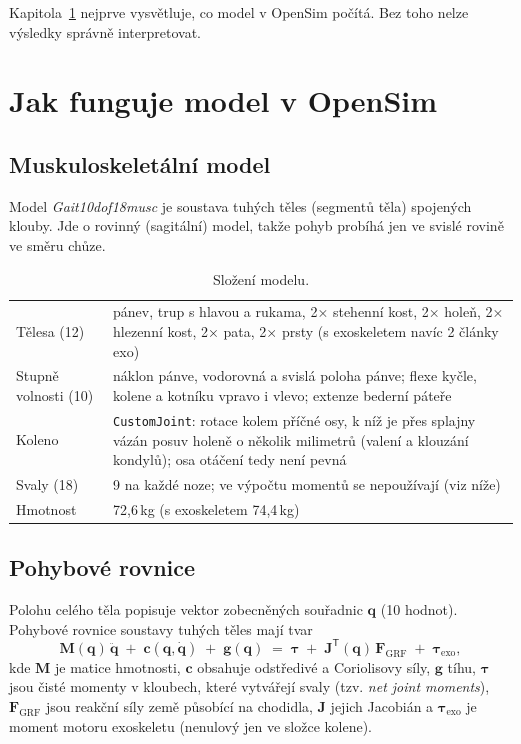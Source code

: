 \documentclass[11pt,a4paper]{article}
\begin{document}
Kapitola~\ref{sec:opensim} nejprve vysvětluje, co model v OpenSim počítá. Bez toho nelze
výsledky správně interpretovat.

\section{Jak funguje model v OpenSim}\label{sec:opensim}

\subsection{Muskuloskeletální model}

Model \emph{Gait10dof18musc} je soustava tuhých těles (segmentů těla) spojených klouby.
Jde o rovinný (sagitální) model, takže pohyb probíhá jen ve svislé rovině ve směru chůze.

\begin{table}[H]
\centering\small
\begin{tabularx}{\textwidth}{lX}
\toprule
Tělesa (12) & pánev, trup s hlavou a rukama, 2× stehenní kost, 2× holeň, 2× hlezenní kost,
              2× pata, 2× prsty (s exoskeletem navíc 2 články exo)\\
Stupně volnosti (10) & náklon pánve, vodorovná a svislá poloha pánve; flexe kyčle, kolene
              a kotníku vpravo i vlevo; extenze bederní páteře\\
Koleno & \texttt{CustomJoint}: rotace kolem příčné osy, k níž je přes splajny vázán posuv holeně
              o několik milimetrů (valení a klouzání kondylů); osa otáčení tedy není pevná\\
Svaly (18) & 9 na každé noze; ve výpočtu momentů se nepoužívají (viz níže)\\
Hmotnost & 72,6\,kg (s exoskeletem 74,4\,kg)\\
\bottomrule
\end{tabularx}
\caption{Složení modelu.}
\end{table}

\subsection{Pohybové rovnice}

Polohu celého těla popisuje vektor zobecněných souřadnic $\mathbf q$ (10 hodnot). Pohybové
rovnice soustavy tuhých těles mají tvar
\begin{equation}
  \mathbf M(\mathbf q)\,\ddot{\mathbf q} \;+\; \mathbf c(\mathbf q,\dot{\mathbf q})
  \;+\; \mathbf g(\mathbf q)
  \;=\; \boldsymbol\tau \;+\; \mathbf J^{\mathsf T}(\mathbf q)\,\mathbf F_{\text{GRF}}
  \;+\; \boldsymbol\tau_{\text{exo}},
  \label{eq:eom}
\end{equation}
kde $\mathbf M$ je matice hmotnosti, $\mathbf c$ obsahuje odstředivé a Coriolisovy síly,
$\mathbf g$ tíhu, $\boldsymbol\tau$ jsou čisté momenty v kloubech, které vytvářejí svaly
(tzv. \emph{net joint moments}), $\mathbf F_{\text{GRF}}$ jsou reakční síly země působící
na chodidla, $\mathbf J$ jejich Jacobián a $\boldsymbol\tau_{\text{exo}}$ je moment motoru
exoskeletu (nenulový jen ve složce kolene).
\end{document}
